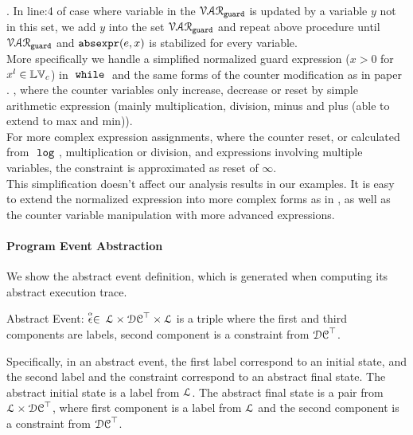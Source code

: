   . 
  In line:4 of case where variable in the $\mathcal{VAR}_{\mathtt{guard}}$ is updated by a variable $y$ not in this set, we add $y$ into the set $\mathcal{VAR}_{\mathtt{guard}}$ and repeat 
  above procedure  until $\mathcal{VAR}_{\mathtt{guard}}$ and $\mathtt{abs}{\mathtt{expr}}(e, x)$ is stabilized for every variable. 
  \\
More specifically 
we handle a simplified normalized guard expression ($ x > 0$ for $x^l \in \mathbb{LV}_c$)
 in $\;\mathtt{while}\;$ and the same forms of the counter modification as in paper \cite{sinn2017complexity}. 
, where the counter variables only increase, decrease or reset by 
simple arithmetic expression (mainly multiplication, division, minus and plus (able to extend to max and min)).
\\
For more complex expression assignments, where the counter reset, or calculated from $~\mathtt{log}~$, 
multiplication or division, and expressions involving multiple variables, the constraint is approximated as reset of $\infty$.
\\
This simplification  doesn't affect our analysis results in our examples. It is easy to extend the normalized expression 
into more complex forms as in \cite{sinn2017complexity}, as well as the 
counter variable manipulation with more advanced expressions.


\paragraph{Program Event Abstraction}
We show the abstract event definition, which is generated when computing its abstract execution trace.

\begin{defn}
  \label{def:abs_event}
  Abstract Event: 
  $\stackrel{\scriptscriptstyle{\alpha}}{\mathtt{\epsilon}{}} \in $
  $\mathcal{L} \times \mathcal{DC}^{\top} \times \mathcal{L}$
  is a 
  triple where the first and third components are labels,
  second component is a constraint from $\mathcal{DC}^{\top}$.
  \end{defn}
  Specifically, in an abstract event, 
  the first label correspond to an initial state, and 
  the second label and the constraint correspond to an abstract final state.
 The abstract initial state is a label from $\mathcal{L}$.
The abstract final state is a pair from $\mathcal{L} \times \mathcal{DC}^{\top}$,  
where first component is a label from $\mathcal{L}$ and the second component is a constraint from $\mathcal{DC}^{\top}$.
%

